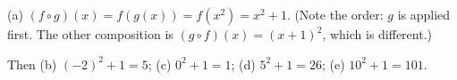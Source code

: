 (a) $(f\circ g)(x)=f(g(x))=f(x^2)=\boxed{x^2+1}$. (Note the order: $g$ is applied first. The other composition is $(g\circ f)(x)=(x+1)^2$, which is different.)

Then
(b) $(-2)^2+1=\boxed{5}$; (c) $0^2+1=\boxed{1}$; (d) $5^2+1=\boxed{26}$; (e) $10^2+1=\boxed{101}$.
